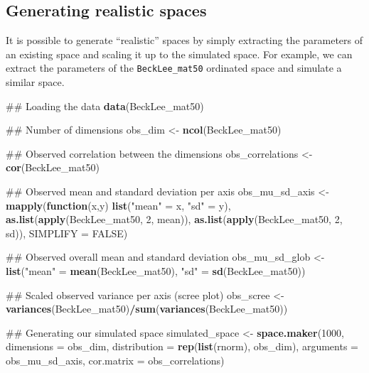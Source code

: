 \documentclass[]{book}
\newenvironment{Shaded}{\begin{snugshade}}{\end{snugshade}}
\newcommand{\KeywordTok}[1]{\textcolor[rgb]{0.13,0.29,0.53}{\textbf{#1}}}
\newcommand{\DataTypeTok}[1]{\textcolor[rgb]{0.13,0.29,0.53}{#1}}
\newcommand{\DecValTok}[1]{\textcolor[rgb]{0.00,0.00,0.81}{#1}}
\newcommand{\StringTok}[1]{\textcolor[rgb]{0.31,0.60,0.02}{#1}}
\newcommand{\OtherTok}[1]{\textcolor[rgb]{0.56,0.35,0.01}{#1}}
\newcommand{\ControlFlowTok}[1]{\textcolor[rgb]{0.13,0.29,0.53}{\textbf{#1}}}
\newcommand{\OperatorTok}[1]{\textcolor[rgb]{0.81,0.36,0.00}{\textbf{#1}}}
\newcommand{\NormalTok}[1]{#1}
\theoremstyle{definition}
\theoremstyle{definition}
\theoremstyle{remark}
\begin{document}
\subsection{Generating realistic
spaces}\label{generating-realistic-spaces}

It is possible to generate ``realistic'' spaces by simply extracting the
parameters of an existing space and scaling it up to the simulated
space. For example, we can extract the parameters of the
\texttt{BeckLee\_mat50} ordinated space and simulate a similar space.

\begin{Shaded}
\begin{Highlighting}[]
\NormalTok{## Loading the data}
\KeywordTok{data}\NormalTok{(BeckLee_mat50)}

\NormalTok{## Number of dimensions}
\NormalTok{obs_dim <-}\StringTok{ }\KeywordTok{ncol}\NormalTok{(BeckLee_mat50)}

\NormalTok{## Observed correlation between the dimensions}
\NormalTok{obs_correlations <-}\StringTok{ }\KeywordTok{cor}\NormalTok{(BeckLee_mat50)}

\NormalTok{## Observed mean and standard deviation per axis}
\NormalTok{obs_mu_sd_axis <-}\StringTok{ }\KeywordTok{mapply}\NormalTok{(}\ControlFlowTok{function}\NormalTok{(x,y) }\KeywordTok{list}\NormalTok{(}\StringTok{"mean"}\NormalTok{ =}\StringTok{ }\NormalTok{x, }\StringTok{"sd"}\NormalTok{ =}\StringTok{ }\NormalTok{y),}
                         \KeywordTok{as.list}\NormalTok{(}\KeywordTok{apply}\NormalTok{(BeckLee_mat50, }\DecValTok{2}\NormalTok{, mean)),}
                         \KeywordTok{as.list}\NormalTok{(}\KeywordTok{apply}\NormalTok{(BeckLee_mat50, }\DecValTok{2}\NormalTok{, sd)), }\DataTypeTok{SIMPLIFY =} \OtherTok{FALSE}\NormalTok{)}

\NormalTok{## Observed overall mean and standard deviation}
\NormalTok{obs_mu_sd_glob <-}\StringTok{ }\KeywordTok{list}\NormalTok{(}\StringTok{"mean"}\NormalTok{ =}\StringTok{ }\KeywordTok{mean}\NormalTok{(BeckLee_mat50), }\StringTok{"sd"}\NormalTok{ =}\StringTok{ }\KeywordTok{sd}\NormalTok{(BeckLee_mat50))}

\NormalTok{## Scaled observed variance per axis (scree plot)}
\NormalTok{obs_scree <-}\StringTok{ }\KeywordTok{variances}\NormalTok{(BeckLee_mat50)}\OperatorTok{/}\KeywordTok{sum}\NormalTok{(}\KeywordTok{variances}\NormalTok{(BeckLee_mat50))}

\NormalTok{## Generating our simulated space}
\NormalTok{simulated_space <-}\StringTok{ }\KeywordTok{space.maker}\NormalTok{(}\DecValTok{1000}\NormalTok{, }\DataTypeTok{dimensions =}\NormalTok{ obs_dim, }
                               \DataTypeTok{distribution =} \KeywordTok{rep}\NormalTok{(}\KeywordTok{list}\NormalTok{(rnorm), obs_dim),}
                               \DataTypeTok{arguments =}\NormalTok{ obs_mu_sd_axis,}
                               \DataTypeTok{cor.matrix =}\NormalTok{ obs_correlations)}


\end{Highlighting}
\end{Shaded}
\end{document}
